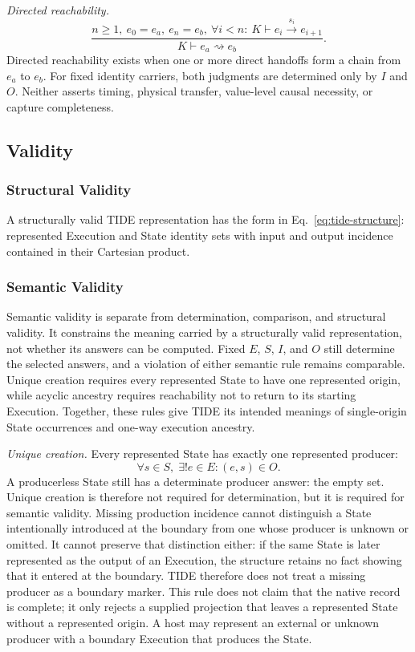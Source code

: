 \documentclass[conference]{IEEEtran}
\theoremstyle{tideproposition}
\newcommand{\direct}[3]{#1\xrightarrow{#2}#3}
\newcommand{\reach}{\rightsquigarrow}
\begin{document}
\emph{Directed reachability.}
\begin{equation}
\frac{n\geq1,\ e_0=e_a,\ e_n=e_b,\ \forall i<n:\ K\vdash\direct{e_i}{s_i}{e_{i+1}}}
     {K\vdash e_a\reach e_b}.
\end{equation}
Directed reachability exists when one or more direct handoffs form a chain from $e_a$ to $e_b$. For fixed identity carriers, both judgments are determined only by $I$ and $O$. Neither asserts timing, physical transfer, value-level causal necessity, or capture completeness.

\subsection{Validity}

\subsubsection{Structural Validity}
A structurally valid TIDE representation has the form in Eq.~\ref{eq:tide-structure}: represented Execution and State identity sets with input and output incidence contained in their Cartesian product.
\subsubsection{Semantic Validity}
Semantic validity is separate from determination, comparison, and structural validity. It constrains the meaning carried by a structurally valid representation, not whether its answers can be computed. Fixed $E$, $S$, $I$, and $O$ still determine the selected answers, and a violation of either semantic rule remains comparable. Unique creation requires every represented State to have one represented origin, while acyclic ancestry requires reachability not to return to its starting Execution. Together, these rules give TIDE its intended meanings of single-origin State occurrences and one-way execution ancestry.

\emph{Unique creation.} Every represented State has exactly one represented producer:
\begin{equation}
\forall s\in S,\;\exists!e\in E:(e,s)\in O.
\label{eq:unique-creation}
\end{equation}
A producerless State still has a determinate producer answer: the empty set. Unique creation is therefore not required for determination, but it is required for semantic validity. Missing production incidence cannot distinguish a State intentionally introduced at the boundary from one whose producer is unknown or omitted. It cannot preserve that distinction either: if the same State is later represented as the output of an Execution, the structure retains no fact showing that it entered at the boundary. TIDE therefore does not treat a missing producer as a boundary marker. This rule does not claim that the native record is complete; it only rejects a supplied projection that leaves a represented State without a represented origin. A host may represent an external or unknown producer with a boundary Execution that produces the State.
\end{document}
